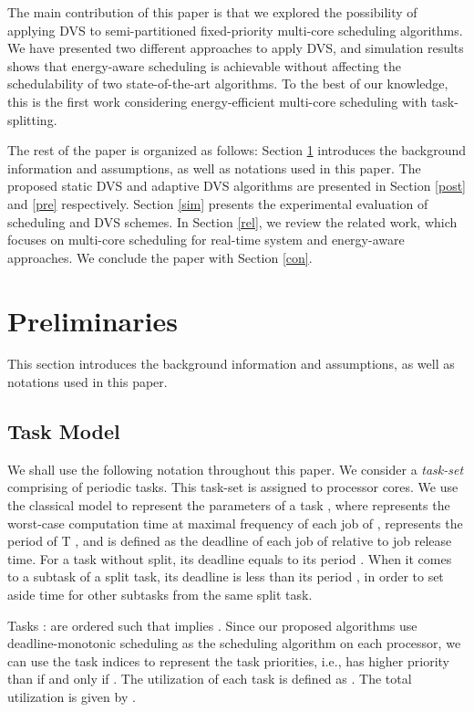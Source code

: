 \documentclass[12pt, journal,compsoc]{IEEEtran}
\begin{document}
The main contribution of this paper is that we explored the possibility of applying DVS to semi-partitioned fixed-priority multi-core scheduling algorithms. We have presented two different approaches to apply DVS, and simulation results shows that energy-aware scheduling is achievable without affecting the schedulability of two state-of-the-art algorithms. To the best of our knowledge, this is the first work considering energy-efficient multi-core scheduling with task-splitting.

The rest of the paper is organized as follows: Section \ref{prelim} introduces the background information and assumptions, as well as notations used in this paper. The proposed static DVS and adaptive DVS algorithms are presented in Section \ref{post} and \ref{pre} respectively. Section \ref{sim} presents the experimental evaluation of scheduling and DVS schemes. In Section \ref{rel}, we review the related work, which focuses on multi-core scheduling for real-time system and energy-aware approaches. We conclude the paper with Section \ref{con}.





\section{Preliminaries}
\label{prelim}

This section introduces the background information and assumptions, as well as notations used in this paper.

\subsection{Task Model}

We shall use the following notation throughout this paper. We consider a \emph{task-set}  comprising of  periodic tasks. This task-set is assigned to  processor cores. We use the classical  model to represent the parameters of a task , where  represents the worst-case computation time at maximal frequency  of each job of ,  represents the period of T , and  is defined as the deadline of each job of  relative to job release time. For a task without split, its deadline  equals to its period . When it comes to a subtask of a split task, its deadline  is less than its period , in order to set aside time for other subtasks from the same split task.

Tasks  :  are ordered such that  implies  . Since our proposed algorithms use deadline-monotonic scheduling as the scheduling algorithm on each processor, we can use the task indices to represent the task priorities, i.e.,  has higher priority than  if and only if . The utilization of each task  is defined as . The total utilization  is given by .
\end{document}
